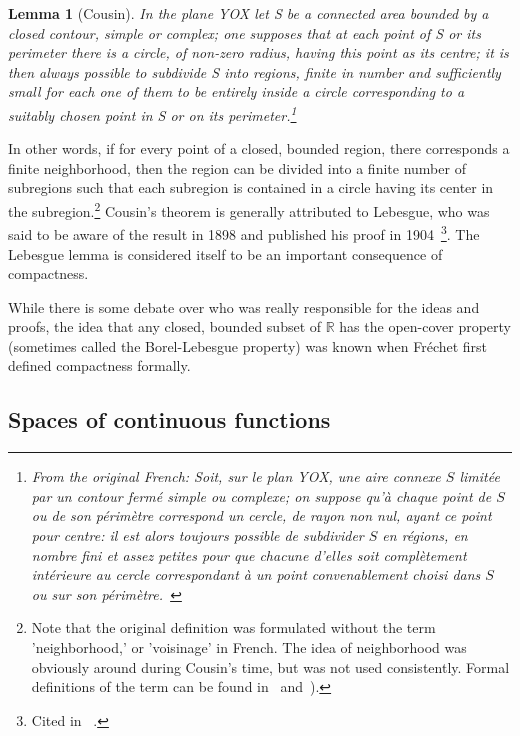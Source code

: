 \documentclass[12pt]{article}
\newtheorem{lem}[thm]{Lemma}
\begin{document}
\begin{lem}
[Cousin] In the plane YOX let S be a connected area bounded by a closed contour, simple or complex; one supposes that at each point of S or its perimeter there is a circle, of non-zero radius, having this point as its centre; it is then always possible to subdivide S into regions, finite in number and sufficiently small for each one of them to be entirely inside a circle corresponding to a suitably chosen point in S or on its perimeter.\footnote{From the original French: Soit, sur le plan YOX, une aire connexe $S$ limit\'{e}e par un contour ferm\'{e} simple ou complexe; on suppose qu'\`{a} chaque point de $S$ ou de son p\'{e}rim\`{e}tre correspond un cercle, de rayon non nul, ayant ce point pour centre: il est alors toujours possible de subdivider $S$ en r\'{e}gions, en nombre fini et assez petites pour que chacune d'elles soit compl\`{e}tement int\'{e}rieure au cercle correspondant \`{a} un point convenablement choisi dans $S$ ou sur son p\'{e}rim\`{e}tre.~\cite[p. 22]{cous}}
\end{lem}

In other words, if for every point of a closed, bounded region, there corresponds a finite neighborhood, then the region can be divided into a finite number of subregions such that each subregion is contained in a circle having its center in the subregion.\footnote{Note that the original definition was formulated without the term 'neighborhood,' or 'voisinage' in French. The idea of neighborhood was obviously around during Cousin's time, but was not used consistently. Formal definitions of the term can be found in~\cite{fre2} and~\cite{haus}).} Cousin's theorem is generally attributed to Lebesgue, who was said to be aware of the result in 1898 and published his proof in 1904~\cite{lebe}\footnote{Cited in ~\cite[p. 29]{hild}.}. The Lebesgue lemma is considered itself to be an important consequence of compactness.

While there is some debate over who was really responsible for the ideas and proofs,
the idea that any closed, bounded subset of $\mathbb{R}$ has the open-cover
property (sometimes called the Borel-Lebesgue property) was known when Fr\'{e}chet first defined compactness formally. 

\subsection{Spaces of continuous functions}
\end{document}
